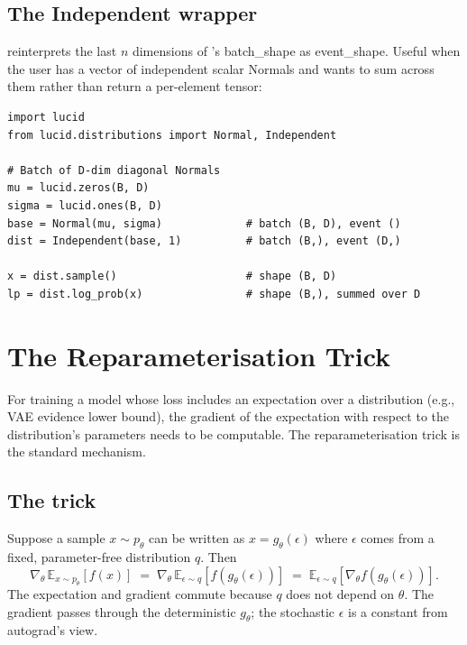 \subsection{The Independent wrapper}
\label{ssec:distributions:independent}

 reinterprets the last $n$ dimensions
of 's batch\_shape as event\_shape. Useful when the
user has a vector of independent scalar Normals and wants
 to sum across them rather than return a
per-element tensor:

\begin{lstlisting}[style=lucid,language=LucidPython]
import lucid
from lucid.distributions import Normal, Independent

# Batch of D-dim diagonal Normals
mu = lucid.zeros(B, D)
sigma = lucid.ones(B, D)
base = Normal(mu, sigma)             # batch (B, D), event ()
dist = Independent(base, 1)          # batch (B,), event (D,)

x = dist.sample()                    # shape (B, D)
lp = dist.log_prob(x)                # shape (B,), summed over D
\end{lstlisting}

\section{The Reparameterisation Trick}
\label{sec:distributions:reparam}

For training a model whose loss includes an expectation over a
distribution (e.g., VAE evidence lower bound), the gradient of
the expectation with respect to the distribution's parameters
needs to be computable. The reparameterisation trick is the
standard mechanism.

\subsection{The trick}
\label{ssec:distributions:reparam_trick}

Suppose a sample $x \sim p_\theta$ can be written as $x =
g_\theta(\epsilon)$ where $\epsilon$ comes from a fixed,
parameter-free distribution $q$. Then
\[
\nabla_\theta \,\mathbb{E}_{x \sim p_\theta}[f(x)]
\;=\; \nabla_\theta \,\mathbb{E}_{\epsilon \sim q}[f(g_\theta(\epsilon))]
\;=\; \mathbb{E}_{\epsilon \sim q}\!\left[\nabla_\theta f(g_\theta(\epsilon))\right].
\]
The expectation and gradient commute because $q$ does not depend
on $\theta$. The gradient passes through the deterministic
$g_\theta$; the stochastic $\epsilon$ is a constant from autograd's
view.

